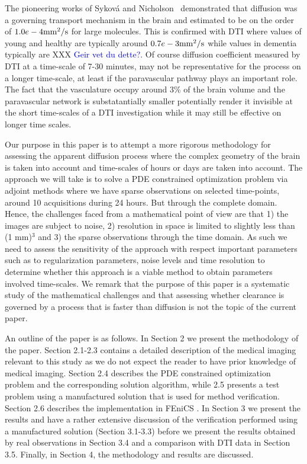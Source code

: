 \documentclass[11pt,a4paper]{article}
\newcommand{\kam}[1]{\textcolor{blue}{#1}}
\begin{document}
The pioneering works of Sykov{\'a} and Nicholson~\cite{sykova2008diffusion} demonstrated
that diffusion was a governing transport mechanism in the brain and estimated to be on the order
of $1.0e-4 \mathrm{mm\sp{2}/s}$ for large molecules. This is confirmed with DTI where values of young and healthy are typically around $0.7e-3 \mathrm{mm\sp{2}/s}$ \cite{Helenius194}
while values in dementia typically are XXX \kam{Geir vet du dette?}. Of course diffusion coefficient 
measured by DTI at a time-scale of 7-30 minutes, may not be representative for the process on a
longer time-scale, at least if the paravascular pathway plays an important role. The fact that the vasculature  occupy around 3\% of the brain volume 
and the paravascular network is substatantially smaller potentially render it invisible at the short time-scales of a DTI investigation 
while it may still be effective on longer time scales.   


Our purpose in this paper is to attempt a more rigorous methodology 
for assessing the apparent diffusion process where
the complex geometry of the brain is taken into account and time-scales of hours or days are taken into account. 
The approach we will take is to solve a PDE constrained optimization problem 
via adjoint methods where we have sparse observations on selected time-points, around 10 acquisitions during 24 hours. But through
the complete domain. Hence, the challenges faced from a mathematical point of view 
are that 1) the images are subject to noise, 2) resolution in space is limited to slightly less than (1 mm)$^3$ and 3)
the sparse observations through the time domain.  As such we need to assess the sensitivity of
the approach with respect important parameters such as to regularization parameters, noise levels and 
time resolution to determine whether this approach is a viable method
to obtain parameters involved time-scales. We remark that the purpose
of this paper is a systematic study of the mathematical challenges and that assessing  
whether clearance is governed by a process that is faster than diffusion is not the topic of the current paper. 

An outline of the paper is as follows. 
In Section 2 we present the methodology of the paper. Section 2.1-2.3 contains a detailed description of the medical imaging 
relevant to this study as we do not expect the reader to have prior knowledge of medical imaging. Section 2.4
describes the PDE constrained optimization problem and the corresponding solution algorithm, while 2.5 presents
a test problem using a manufactured solution that is used for method verification. Section 2.6 describes the implementation 
in FEniCS \cite{LoggMardalEtAl2012a}. In Section 3 we present the results and have a rather extensive discussion of the verification performed
using a manufactured solution (Section 3.1-3.3) before we present the results obtained by real observations in Section 3.4     
and a comparison with DTI data in Section 3.5. Finally, in Section 4, the methodology and results are discussed.  
   
\end{document}
